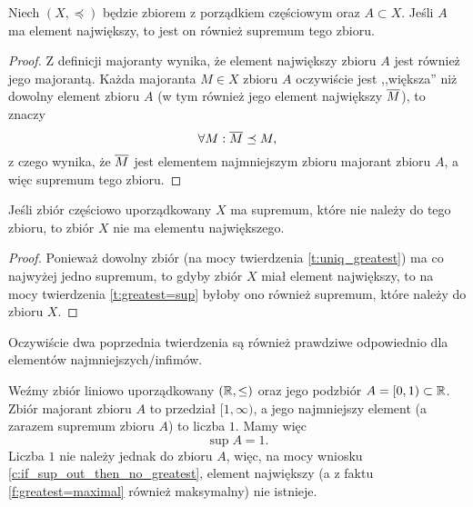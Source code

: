 \begin{theorem}
    \label{t:greatest=sup}
    Niech $(X, \preceq)$ będzie zbiorem z porządkiem częściowym oraz $A \subset X$. Jeśli $A$ ma element największy, to jest on również supremum tego zbioru.
\end{theorem}
\begin{proof}
    Z definicji majoranty wynika, że element największy zbioru $A$ jest również jego majorantą. Każda majoranta $M \in X$ zbioru $A$ oczywiście jest ,,większa'' niż dowolny element zbioru $A$ (w tym również jego element największy $\overline{M}$), to znaczy
    $$ \forall M : \overline{M} \preceq M, $$
    z czego wynika, że $\overline{M}$ jest elementem najmniejszym zbioru majorant zbioru $A$, a więc supremum tego zbioru.
\end{proof}

\begin{corollary}
    \label{c:if_sup_out_then_no_greatest}
    Jeśli zbiór częściowo uporządkowany $X$ ma supremum, które nie należy do tego zbioru, to zbiór $X$ nie ma elementu największego.
\end{corollary}
\begin{proof}
    Ponieważ dowolny zbiór (na mocy twierdzenia \ref{t:uniq_greatest}) ma co najwyżej jedno supremum, to gdyby zbiór $X$ miał element największy, to na mocy twierdzenia \ref{t:greatest=sup} byłoby ono również supremum, które należy do zbioru $X$.
\end{proof}

Oczywiście dwa poprzednia twierdzenia są również prawdziwe odpowiednio dla elementów najmniejszych/infimów.

\begin{example}
    Weźmy zbiór liniowo uporządkowany $(\mathbb R, \leq)$ oraz jego podzbiór $A = [0, 1) \subset \mathbb R$. Zbiór majorant zbioru $A$ to przedział $[1, \infty)$, a jego najmniejszy element (a zarazem supremum zbioru $A$) to liczba $1$. Mamy więc
    $$ \sup A = 1. $$
    Liczba $1$ nie należy jednak do zbioru $A$, więc, na mocy wniosku \ref{c:if_sup_out_then_no_greatest}, element największy (a z faktu \ref{f:greatest=maximal} również maksymalny) nie istnieje.
\end{example}

